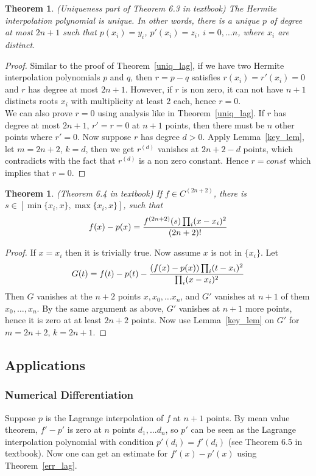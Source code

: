 \documentclass{article} %
\theoremstyle{break}
\newtheorem{thm}[definition]{Theorem}
\begin{document}
  \begin{thm}\label{uniq_her} (Uniqueness part of Theorem 6.3 in textbook)
 The Hermite interpolation polynomial is unique. In other words, there is a unique $p$ of degree at most $2n+1$ such that $p(x_i)=y_i$, $p'(x_i)=z_i$, $i=0, \dots n$, where $x_i$ are distinct.
\end{thm}
\begin{proof} Similar to the proof of Theorem~\ref{uniq_lag}, if we have two Hermite interpolation polynomials $p$ and $q$, then $r=p-q$ satisfies $r(x_i)=r'(x_i)=0$ and $r$ has degree at most $2n+1$. However, if $r$ is non zero, it can not have $n+1$ distincts roots $x_i$ with multiplicity at least $2$ each, hence $r=0$.\\

  We can also prove $r=0$ using analysis like in Theorem~\ref{uniq_lag}. If $r$ has degree at most $2n+1$, $r'=r=0$ at $n+1$ points, then there must be $n$ other points where $r'=0$. Now suppose $r$ has degree $d>0$. Apply Lemma~\ref{key_lem}, let $m=2n+2$, $k=d$, then we get $r^{(d)}$ vanishes at $2n+2-d$ points, which contradicts with the fact that $r^{(d)}$ is a non zero constant. Hence $r=const$ which implies that $r=0$.
\end{proof}

\begin{thm}\label{err_her} (Theorem 6.4 in textbook) If $f\in C^{(2n+2)}$, there is $s\in [\min\{x_i, x\}, \max\{x_i, x\}]$, such that
  \[f(x)-p(x)={f^{(2n+2)}(s)\prod_i(x-x_i)^2\over (2n+2)!}\]
\end{thm}

\begin{proof}
  If $x=x_i$ then it is trivially true. Now assume $x$ is not in $\{x_i\}$. Let
  \[G(t)=f(t)-p(t)-{(f(x)-p(x))\prod_i(t-x_i)^2\over \prod_i(x-x_i)^2}\]
  Then $G$ vanishes at the $n+2$ points $x, x_0, \dots x_n$, and $G'$ vanishes at $n+1$ of them $x_0, \dots, x_n$. By the same argument as above, $G'$ vanishes at $n+1$ more points, hence it is zero at at least $2n+2$ points. Now use Lemma~\ref{key_lem} on $G'$ for $m=2n+2$, $k=2n+1$.
\end{proof}


\subsection{Applications}
\subsubsection{Numerical Differentiation}\label{nd}
Suppose $p$ is the Lagrange interpolation of $f$ at $n+1$ points. By mean value theorem, $f'-p'$ is zero at $n$ points $d_1, \dots d_n$, so $p'$ can be seen as the Lagrange interpolation polynomial with condition $p'(d_i)=f'(d_i)$ (see Theorem 6.5 in textbook). Now one can get an estimate for $f'(x)-p'(x)$ using Theorem~\ref{err_lag}.\\
\end{document}
